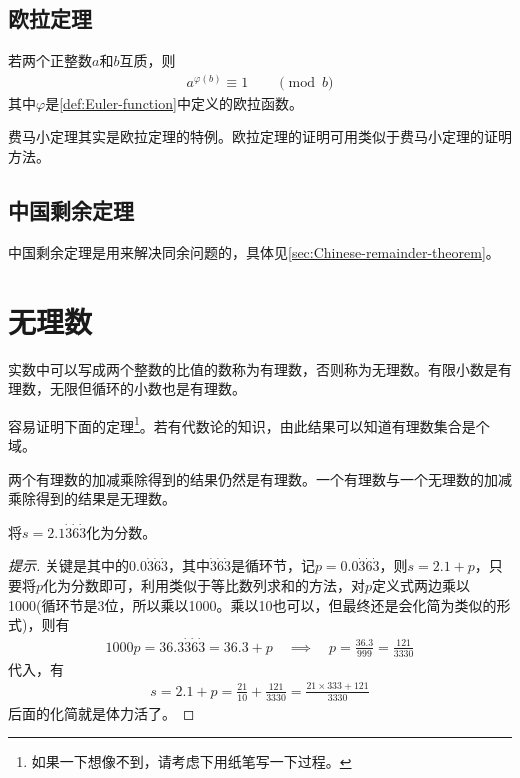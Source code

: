 
\subsection{欧拉定理}
\label{sec:euler-theorem}
\begin{theorem}
  若两个正整数$a$和$b$互质，则
  \begin{align*}
    a^{\varphi(b)}\equiv1\quad\quad\pmod{b}
  \end{align*}
  其中$\varphi$是\ref{def:Euler-function}中定义的欧拉函数。
\end{theorem}

费马小定理其实是欧拉定理的特例。欧拉定理的证明可用类似于费马小定理的证明方法。

\subsection{中国剩余定理}
\label{sec:china-remainder-theorem}
中国剩余定理是用来解决同余问题的，具体见\ref{sec:Chinese-remainder-theorem}。

\section{无理数}
\label{sec:irrational-numbers}

实数中可以写成两个整数的比值的数称为有理数，否则称为无理数。有限小数是有理数，无限但循环的小数也是有理数。

容易证明下面的定理\footnote{如果一下想像不到，请考虑下用纸笔写一下过程。}。若有代数论的知识，由此结果可以知道有理数集合是个域。

\begin{theorem}\label{th:rational-number-field}
  两个有理数的加减乘除得到的结果仍然是有理数。一个有理数与一个无理数的加减乘除得到的结果是无理数。
\end{theorem}

\begin{example}
  将$s=2.1\dot3\dot6\dot3$化为分数。
\end{example}
\begin{proof}[提示]
  关键是其中的$0.0\dot3\dot6\dot3$，其中$\dot3\dot6\dot3$是循环节，记$p=0.0\dot3\dot6\dot3$，则$s=2.1+p$，只要将$p$化为分数即可，利用类似于等比数列求和的方法，对$p$定义式两边乘以1000(循环节是3位，所以乘以1000。乘以10也可以，但最终还是会化简为类似的形式)，则有
  \begin{align*}
    1000p = 36.3\dot3\dot6\dot3 = 36.3 + p \quad\implies\quad p=\frac{36.3}{999}=\frac{121}{3330}
  \end{align*}
  代入，有
  \begin{align*}
    s=2.1+p = \frac{21}{10} + \frac{121}{3330} = \frac{21\times333 + 121}{3330}
  \end{align*}
  后面的化简就是体力活了。
\end{proof}


